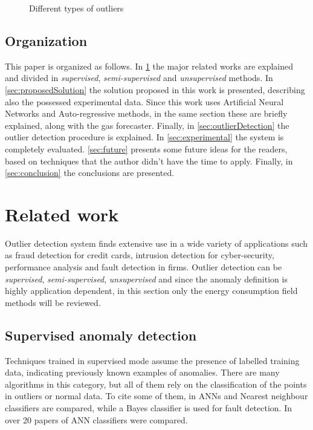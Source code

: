 \documentclass{sig-alternate-sigmod07}
\begin{document}
\begin{figure}[h!]
\centering
{}
\caption{Different types of outliers}
\label{fig:outlierTypes}
\end{figure}


\subsection{Organization}

This paper is organized as follows. In \cref{sec:related} the major related works are explained and divided in \emph{supervised}, \emph{semi-supervised} and \emph{unsupervised} methods. In \cref{sec:proposedSolution} the solution proposed in this work is presented, describing also the possessed experimental data. Since this work uses Artificial Neural Networks and Auto-regressive methods, in the same section these are briefly explained, along with the gas forecaster. Finally, in \cref{sec:outlierDetection} the outlier detection procedure is explained. In \cref{sec:experimental} the system is completely evaluated. \cref{sec:future} presents some future ideas for the readers, based on techniques that the author didn't have the time to apply. Finally, in \cref{sec:conclusion} the conclusions are presented.


\section{Related work}
\label{sec:related}
Outlier detection system finds extensive use in a wide variety of applications such as fraud detection for credit cards, intrusion detection for cyber-security, performance analysis and fault detection in firms. Outlier detection can be \emph{supervised}, \emph{semi-supervised}, \emph{unsupervised} and since the anomaly definition is highly application dependent, in this section only the energy consumption field methods will be reviewed.


\subsection{Supervised anomaly detection}
Techniques trained in supervised mode assume the presence of labelled training data, indicating previously known examples of anomalies. There are many algorithms in this category, but all of them rely on the classification of the points in outliers or normal data. To cite some of them, in \cite{house1999classification} ANNs and Nearest neighbour classifiers are compared, while a Bayes classifier is used for fault detection. In \cite{hippert2001neural} over 20 papers of ANN classifiers were compared.
\end{document}
